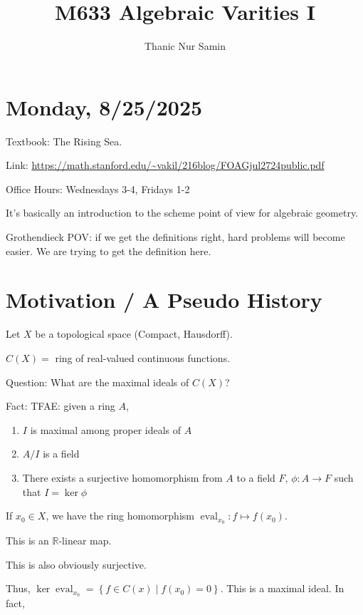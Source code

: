 \documentclass{article}
\title{M633 Algebraic Varities I}
\author{Thanic Nur Samin}
\date{}
\theoremstyle{definition}
\begin{document}
    \maketitle

    \section*{Monday, 8/25/2025}
    
    Textbook: The Rising Sea.
    
    Link: \url{https://math.stanford.edu/~vakil/216blog/FOAGjul2724public.pdf}

    Office Hours: Wednesdays 3-4, Fridays 1-2

    It's basically an introduction to the scheme point of view for algebraic geometry.

    Grothendieck POV: if we get the definitions right, hard problems will become easier. We are trying to get the definition here.

    \section*{Motivation / A Pseudo History}

    Let \(X\) be a topological space (Compact, Hausdorff).

    \(C(X)=\) ring of real-valued continuous functions.

    Question: What are the maximal ideals of \(C(X)\)?

    Fact: TFAE: given a ring \(A\),

    \begin{enumerate}[label=\roman*)]
        \item \(I\) is maximal among proper ideals of \(A\)
        \item \(A / I\) is a field
        \item There exists a surjective homomorphism from \(A\) to a field \(F\), \(\phi : A \to F\) such that \(I = \ker \phi\)  
    \end{enumerate} 

    If \(x_0\in X\), we have the ring homomorphism \(\operatorname{eval}_{x_0}: f \mapsto f(x_0)\).

    This is an \(\mathbb{R}\)-linear map.

    This is also obviously surjective.

    Thus, \(\ker \operatorname{eval}_{x_0} = \left\{ f\in C(x) \mid f(x_0) = 0 \right\}\). This is a maximal ideal. In fact,
\end{document}
